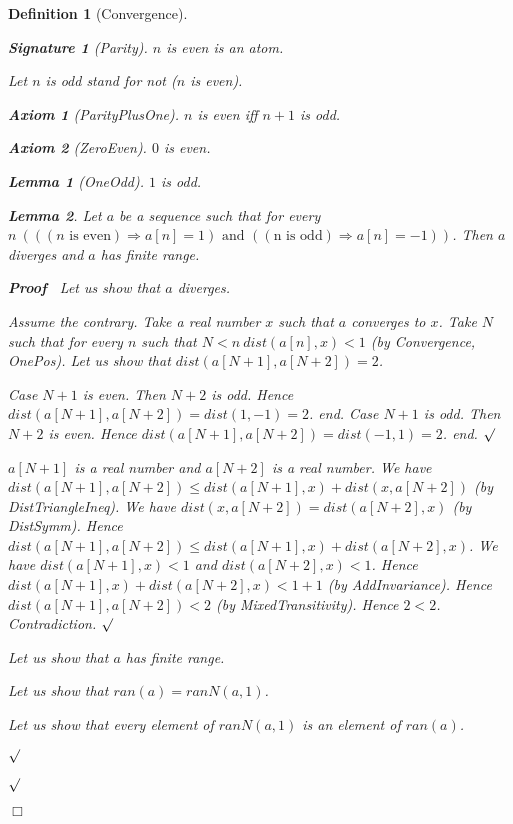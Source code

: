 \documentclass{article}
\newenvironment{forthel}{\begin{leftbar}}{\end{leftbar}}
\newenvironment{proof}{\noindent\textbf{Proof\ }}{\hspace*{\fill}$\Box$\medskip}
\newenvironment{subproof}{\begin{list}{}{}
		\item[\text{Proof}]}{\hfill $\surd$ \end{list}}
\newtheorem{axiom}{Axiom}
\newtheorem{lemma}{Lemma}
\newtheorem{definition}{Definition}
\newtheorem{signature}{Signature}
\begin{document}
\begin{forthel}
\begin{definition}[Convergence]
	\begin{signature}[Parity]
	$n$ is even is an atom.
	\end{signature}
	
	\noindent Let $n$ is odd stand for not ($n$ is even).
	
	\begin{axiom}[ParityPlusOne]
	$n$ is even iff $n + 1$ is odd.
	\end{axiom}

	\begin{axiom}[ZeroEven]
	$0$ is even.
	\end{axiom}
	
	\begin{lemma}[OneOdd]
	$1$ is odd.
	\end{lemma} 
	
	\begin{lemma}
	Let $a$ be a sequence such that for every $n \ (((n \text{ is even}) \Rightarrow a[n] = 1) \text{ and } ((\text{n is odd}) \Rightarrow a[n] = -1))$.
	Then $a$ diverges and $a$ has finite range.
	\end{lemma}
	\begin{proof}
	Let us show that $a$ diverges.
	\begin{subproof}
	Assume the contrary.
	Take a real number $x$ such that $a$ converges to $x$.
	Take $N$ such that for every $n$ such that $N < n \ dist(a[n],x) < 1$ (by Convergence, OnePos).
	Let us show that $dist(a[N + 1],a[N + 2]) = 2$.
	\begin{subproof}
	Case $N + 1$ is even.
	Then $N + 2$ is odd.
	Hence $dist(a[N + 1],a[N + 2]) = dist(1,-1) = 2$.
	end.
	Case $N + 1$ is odd.
	Then $N + 2$ is even.
	Hence $dist(a[N + 1],a[N + 2]) = dist(-1,1) = 2$.
	end.
	\end{subproof}
	$a[N + 1]$ is a real number and $a[N + 2]$ is a real number.
	We have $dist(a[N + 1],a[N + 2]) \leq dist(a[N + 1],x) + dist(x,a[N + 2])$ (by DistTriangleIneq).
	We have $dist(x,a[N + 2]) = dist(a[N + 2],x)$ (by DistSymm).
	Hence $dist(a[N + 1],a[N + 2]) \leq dist(a[N + 1],x) + dist(a[N + 2],x)$.
	We have $dist(a[N + 1],x) < 1$ and $dist(a[N + 2],x) < 1$.
	Hence $dist(a[N + 1],x) + dist(a[N + 2],x) < 1 + 1$ (by AddInvariance).
	Hence $dist(a[N + 1],a[N + 2]) < 2$ (by MixedTransitivity).
	Hence $2 < 2$.
	Contradiction.
	\end{subproof}
	Let us show that $a$ has finite range.
	\begin{subproof}
	Let us show that $ran(a) = ranN(a,1)$.
	\begin{subproof}
	Let us show that every element of $ranN(a,1)$ is an element of $ran(a)$.

\end{subproof}
\end{subproof}
\end{proof}
\end{definition}
\end{forthel}
\end{document}
